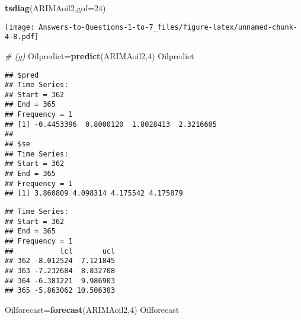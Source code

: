\documentclass[
]{article}
\newenvironment{Shaded}{\begin{snugshade}}{\end{snugshade}}
\newcommand{\AttributeTok}[1]{\textcolor[rgb]{0.13,0.29,0.53}{#1}}
\newcommand{\CommentTok}[1]{\textcolor[rgb]{0.56,0.35,0.01}{\textit{#1}}}
\newcommand{\DecValTok}[1]{\textcolor[rgb]{0.00,0.00,0.81}{#1}}
\newcommand{\FloatTok}[1]{\textcolor[rgb]{0.00,0.00,0.81}{#1}}
\newcommand{\FunctionTok}[1]{\textcolor[rgb]{0.13,0.29,0.53}{\textbf{#1}}}
\newcommand{\NormalTok}[1]{#1}
\newcommand{\OtherTok}[1]{\textcolor[rgb]{0.56,0.35,0.01}{#1}}
\newcommand{\SpecialCharTok}[1]{\textcolor[rgb]{0.81,0.36,0.00}{\textbf{#1}}}
\begin{document}
\begin{Shaded}
\begin{Highlighting}[]
\FunctionTok{tsdiag}\NormalTok{(ARIMAoil2,}\AttributeTok{gof=}\DecValTok{24}\NormalTok{)}
\end{Highlighting}
\end{Shaded}

\texttt{[image: Answers-to-Questions-1-to-7\_files/figure-latex/unnamed-chunk-4-8.pdf]}

\begin{Shaded}
\begin{Highlighting}[]
\CommentTok{\# (g)}
\NormalTok{Oilpredict}\OtherTok{=}\FunctionTok{predict}\NormalTok{(ARIMAoil2,}\DecValTok{4}\NormalTok{)}
\NormalTok{Oilpredict}
\end{Highlighting}
\end{Shaded}

\begin{verbatim}
## $pred
## Time Series:
## Start = 362 
## End = 365 
## Frequency = 1 
## [1] -0.4453396  0.8000120  1.8028413  2.3216605
## 
## $se
## Time Series:
## Start = 362 
## End = 365 
## Frequency = 1 
## [1] 3.860809 4.098314 4.175542 4.175879
\end{verbatim}

\begin{Shaded}
\end{Shaded}

\begin{verbatim}
## Time Series:
## Start = 362 
## End = 365 
## Frequency = 1 
##           lcl       ucl
## 362 -8.012524  7.121845
## 363 -7.232684  8.832708
## 364 -6.381221  9.986903
## 365 -5.863062 10.506383
\end{verbatim}

\begin{Shaded}
\begin{Highlighting}[]
\NormalTok{Oilforecast}\OtherTok{=}\FunctionTok{forecast}\NormalTok{(ARIMAoil2,}\DecValTok{4}\NormalTok{)}
\NormalTok{Oilforecast}
\end{Highlighting}
\end{Shaded}
\end{document}
